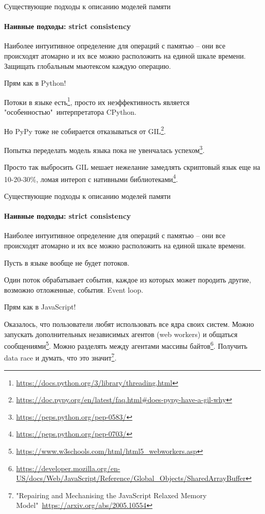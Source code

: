 \begin{frame}{Существующие подходы к описанию моделей памяти}
\framesubtitle{Наивные подходы: strict consistency}

Наиболее интуитивное определение для операций с памятью -- они все происходят атомарно и их все можно расположить на единой шкале времени.
Защищать глобальным мьютексом каждую операцию.
 
\pause
Прям как в Python!

\pause
Потоки в языке есть\footnote<3->{\tiny\url{https://docs.python.org/3/library/threading.html}}, просто их неэффективность является "особенностью"\ интерпретатора CPython.

\pause
Но PyPy тоже не собирается отказываться от GIL\footnote<4->{\tiny\url{https://doc.pypy.org/en/latest/faq.html#does-pypy-have-a-gil-why}}.

\pause
Попытка переделать модель языка пока не увенчалась успехом\footnote<5->{\tiny\url{https://peps.python.org/pep-0583/}}.

\pause
Просто так выбросить GIL мешает нежелание замедлять скриптовый язык еще на 10-20-30\%, ломая интероп с нативными библиотеками\footnote<6->{\tiny\url{https://peps.python.org/pep-0703/}}.
\end{frame}


\begin{frame}[fragile, t]{Существующие подходы к описанию моделей памяти}
\framesubtitle{Наивные подходы: strict consistency}

Наиболее интуитивное определение для операций с памятью -- они все происходят атомарно и их все можно расположить на единой шкале времени.

\pause
Пусть в языке вообще не будет потоков.

\pause
Один поток обрабатывает события, каждое из которых может породить другие, возможно отложенные, события.
\pause
Event loop.

\pause
Прям как в JavaScript!

\pause
Оказалось, что пользователи любят использовать все ядра своих систем.
\pause
Можно запускать дополнительных независимых агентов (web workers) и общаться сообщениями\footnote<7->{\tiny\url{https://www.w3schools.com/html/html5_webworkers.asp}}.
\pause
Можно разделять между агентами массивы байтов\footnote<8->{\tiny\url{https://developer.mozilla.org/en-US/docs/Web/JavaScript/Reference/Global_Objects/SharedArrayBuffer}}.
\pause
Получить data race и думать, что это значит\footnote<9->{\tiny "Repairing and Mechanising the JavaScript Relaxed Memory Model"\ \url{https://arxiv.org/abs/2005.10554}}.

\end{frame}


